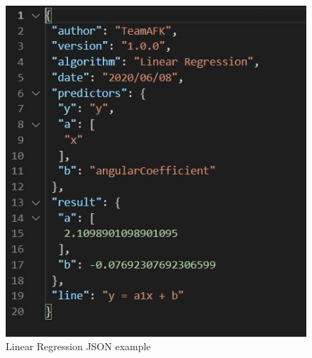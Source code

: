 \begin{figure}[H]
\centering
\includegraphics[scale=0.50]{img/json/jsonRL.jpg}
\caption{Linear Regression JSON example}
\end{figure}